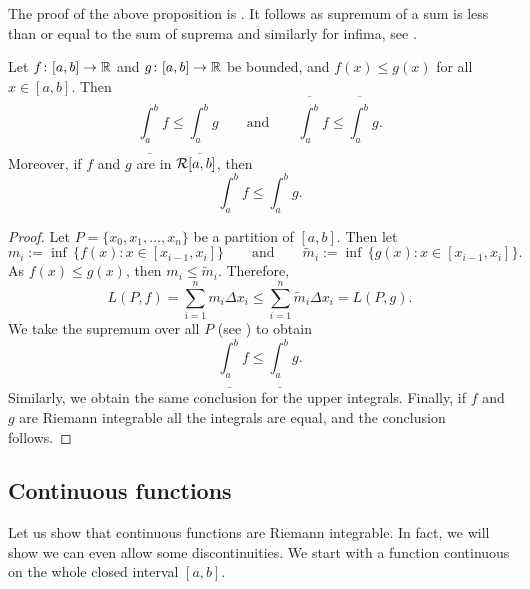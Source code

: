 The proof of the above proposition is .
It follows as supremum of a sum is less than or equal to the sum of
suprema and similarly for infima, see .

\begin{prop}[Monotonicity]
Let $f \colon [a,b] \to {\mathbb{R}}$ and $g \colon [a,b] \to {\mathbb{R}}$ be
bounded, and $f(x) \leq g(x)$
for all $x \in [a,b]$.  Then
\begin{equation*}
\underline{\int_a^b} f 
\leq
\underline{\int_a^b} g 
\qquad \text{and} \qquad
\overline{\int_a^b} f 
\leq
\overline{\int_a^b} g .
\end{equation*}
Moreover, if $f$ and $g$ are in ${\mathcal{R}}[a,b]$, then
\begin{equation*}
\int_a^b f 
\leq
\int_a^b g .
\end{equation*}
\end{prop}

\begin{proof}
Let $P = \{ x_0, x_1, \ldots, x_n \}$ be a partition of $[a,b]$.  Then
let
\begin{equation*}
m_i := \inf \, \bigl\{ f(x) : x \in [x_{i-1},x_i] \bigr\}
\qquad \text{and} \qquad
\widetilde{m}_i := \inf \, \bigl\{ g(x) : x \in [x_{i-1},x_i] \bigr\} .
\end{equation*}
As $f(x) \leq g(x)$, then $m_i \leq \widetilde{m}_i$.
Therefore,
\begin{equation*}
L(P,f)
=
\sum_{i=1}^n m_i \Delta x_i
\leq
\sum_{i=1}^n \widetilde{m}_i \Delta x_i
=
L(P,g) .
\end{equation*}
We take the supremum over all $P$ (see ) to obtain 
\begin{equation*}
\underline{\int_a^b} f 
\leq
\underline{\int_a^b} g .
\end{equation*}
Similarly, we obtain the same conclusion for the upper integrals.
Finally,
if $f$ and $g$ are Riemann integrable all the integrals are equal,
and the conclusion follows.
\end{proof}

\subsection{Continuous functions}

Let us show that continuous functions are Riemann integrable.  In fact, we
will show we can even allow some discontinuities.  We start with a
function continuous on the whole closed interval $[a,b]$.

